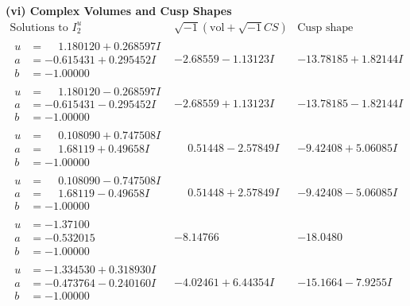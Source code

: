 \documentclass[1p]{elsarticle_modified}
\theoremstyle{definition}
\newcommand{\I}{\sqrt{-1}}
\begin{document}
\newpage\flushleft \textbf{(vi) Complex Volumes and Cusp Shapes}
$$\begin{array}{c|c|c}  
\text{Solutions to }I^u_{2}& \I (\text{vol} + \sqrt{-1}CS) & \text{Cusp shape}\\
 \hline 
\begin{aligned}
u &= \phantom{-}1.180120 + 0.268597 I \\
a &= -0.615431 + 0.295452 I \\
b &= -1.00000\phantom{ +0.000000I}\end{aligned}
 & -2.68559 - 1.13123 I & -13.78185 + 1.82144 I \\ \hline\begin{aligned}
u &= \phantom{-}1.180120 - 0.268597 I \\
a &= -0.615431 - 0.295452 I \\
b &= -1.00000\phantom{ +0.000000I}\end{aligned}
 & -2.68559 + 1.13123 I & -13.78185 - 1.82144 I \\ \hline\begin{aligned}
u &= \phantom{-}0.108090 + 0.747508 I \\
a &= \phantom{-}1.68119 + 0.49658 I \\
b &= -1.00000\phantom{ +0.000000I}\end{aligned}
 & \phantom{-}0.51448 - 2.57849 I & -9.42408 + 5.06085 I \\ \hline\begin{aligned}
u &= \phantom{-}0.108090 - 0.747508 I \\
a &= \phantom{-}1.68119 - 0.49658 I \\
b &= -1.00000\phantom{ +0.000000I}\end{aligned}
 & \phantom{-}0.51448 + 2.57849 I & -9.42408 - 5.06085 I \\ \hline\begin{aligned}
u &= -1.37100\phantom{ +0.000000I} \\
a &= -0.532015\phantom{ +0.000000I} \\
b &= -1.00000\phantom{ +0.000000I}\end{aligned}
 & -8.14766\phantom{ +0.000000I} & -18.0480\phantom{ +0.000000I} \\ \hline\begin{aligned}
u &= -1.334530 + 0.318930 I \\
a &= -0.473764 - 0.240160 I \\
b &= -1.00000\phantom{ +0.000000I}\end{aligned}
 & -4.02461 + 6.44354 I & -15.1664 - 7.9255 I \\ \hline\begin{aligned}

\end{aligned}
\end{array}$$
\end{document}

